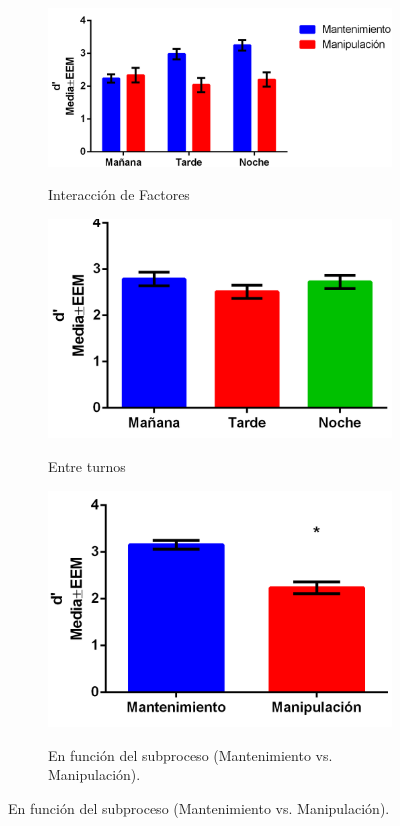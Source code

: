 \documentclass[12pt,letterpaper,final]{article}
\begin{document}
\begin{figure}[h]
 \begin{footnotesize}
  \begin{subfigure}[a]{.4\textwidth}	
	\centering
	\caption{Interacción de Factores}
	\includegraphics[scale=0.6]{graficas/dprim_intr.png}
	\label{Sub:dprimint}
	\end{subfigure}
    \hfill
    \begin{subfigure}[a]{\textwidth}	
	\centering
	\caption{Entre turnos}
	\includegraphics[scale=0.6]{graficas/dprim_Tur.png}
	\label{Sub:dprimtur}
	\end{subfigure}
	
	\begin{subfigure}[b]{0.9\textwidth}	
	\centering
	\caption{En función del subproceso (Mantenimiento vs. Manipulación).}
	\includegraphics[scale=0.8]{graficas/dprim_Tar.png}
	\label{Sub:dprimtar}
	\end{subfigure}
 \end{footnotesize}
	

\end{figure}
\end{document}
